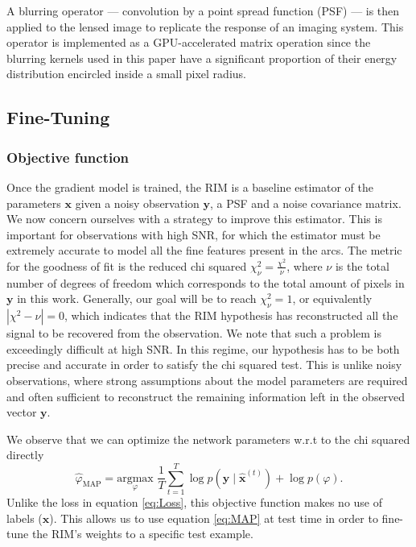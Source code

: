 A blurring operator --- convolution by a point spread function (PSF) --- is then 
applied to the lensed image to replicate the response of an imaging system. 
This operator is implemented as a GPU-accelerated matrix operation 
since the blurring kernels used in this paper have a significant proportion
of their energy distribution encircled inside a small pixel radius. 

\subsection{Fine-Tuning}\label{sec:fine-tuning}

\subsubsection{Objective function}
Once the gradient model is trained, the RIM is a baseline 
estimator of the parameters $\mathbf{x}$ given a noisy observation $\mathbf{y}$, 
a PSF and a noise covariance matrix. 
We now concern ourselves with a strategy to improve 
this estimator. 
This is important 
for observations with high SNR, for which the estimator
must be extremely accurate to model all the fine features present in the arcs.
The metric for the goodness of fit 
is the reduced chi squared $\chi^2_\nu = \frac{\chi^2}{\nu}$, 
where $\nu$ is the total number of degrees of freedom which corresponds to 
the total amount of pixels in $\mathbf{y}$ in this work.
Generally, our goal will be to reach $\chi^2_\nu = 1$, or equivalently $|\chi^2 - \nu| = 0$, 
which indicates that the RIM hypothesis has reconstructed all the signal 
to be recovered from the observation. 
We note that such a problem is exceedingly  
difficult at high SNR. In this regime, 
our hypothesis has 
to be both precise and accurate in order to satisfy the chi squared test. 
This is unlike noisy observations, where strong assumptions about the model 
parameters are required and often sufficient to reconstruct the 
remaining information left in the observed vector $\mathbf{y}$.

We observe that we can optimize the network parameters w.r.t to the 
chi squared directly
\begin{equation}\label{eq:MAP} 
        \hat{\varphi}_{\mathrm{MAP}} = \underset{\varphi}{\mathrm{argmax}}\,\, 
        \frac{1}{T}\sum_{t=1}^{T} \log p(\mathbf{y} \mid \mathbf{\hat{x}}^{(t)}) + \log p(\varphi).
\end{equation} 
Unlike the loss in equation \eqref{eq:Loss}, this objective function makes no use of labels 
($\mathbf{x}$). 
This allows us to use equation \eqref{eq:MAP} at test time in order to fine-tune the RIM's weights to a specific test example. 

